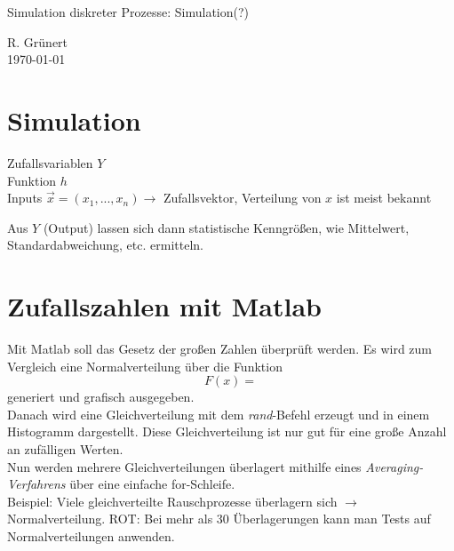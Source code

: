 \documentclass[11pt, a4paper]{article}
\begin{document}
\begin{center}
  \Large{Simulation diskreter Prozesse: Simulation(?)}
\end{center}

\begin{flushright}
  R. Grünert\\
  \today
\end{flushright}

\section{Simulation}
\noindent Zufallsvariablen $Y$\\
\noindent Funktion $h$\\
\noindent Inputs $\vec{x} = (x_{1}, ..., x_{n})\rightarrow$ Zufallsvektor, Verteilung von $x$ ist meist bekannt\\

\begin{figure}[H]
\centering
{}
\end{figure}

Aus $Y$ (Output) lassen sich dann statistische Kenngrößen, wie Mittelwert, Standardabweichung, etc. ermitteln.

\section{Zufallszahlen mit Matlab}
Mit Matlab soll das Gesetz der großen Zahlen überprüft werden. Es wird zum Vergleich eine Normalverteilung über die Funktion
\[F(x) = \]
generiert und grafisch ausgegeben.\\

Danach wird eine Gleichverteilung mit dem \emph{rand}-Befehl erzeugt und in einem Histogramm dargestellt. Diese Gleichverteilung ist nur gut für eine große Anzahl an zufälligen Werten.\\

Nun werden mehrere Gleichverteilungen überlagert mithilfe eines \emph{Averaging-Verfahrens} über eine einfache for-Schleife.\\


Beispiel: Viele gleichverteilte Rauschprozesse überlagern sich $\rightarrow$ Normalverteilung.
ROT: Bei mehr als 30 Überlagerungen kann man Tests auf Normalverteilungen anwenden.

\section{}
\end{document}
